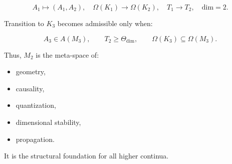 \[
A_1 \mapsto (A_1, A_2),\quad
\Omega(K_1) \to \Omega(K_2),\quad
T_1 \to T_2,\quad
\text{dim} = 2.
\]

Transition to $K_3$ becomes admissible only when:

\[
A_3 \in A(M_3),\qquad
T_2 \ge \Theta_{\text{dim}},
\qquad
\Omega(K_3) \subseteq \Omega(M_3).
\]

Thus, $M_2$ is the meta-space of:

\begin{itemize}
    \item geometry,
    \item causality,
    \item quantization,
    \item dimensional stability,
    \item propagation.
\end{itemize}

It is the structural foundation for all higher continua.
